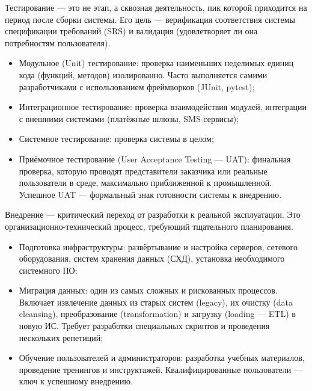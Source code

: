 \documentclass{SibFU-docs}
\begin{document}

Тестирование — это не этап, а сквозная деятельность, пик которой приходится на период после сборки системы. Его цель — верификация соответствия системы спецификации требований (SRS) и валидация (удовлетворяет ли она потребностям пользователя).


\begin{itemize}[label=-]
    \item Модульное (Unit) тестирование: проверка наименьших неделимых единиц кода (функций, методов) изолированно. Часто выполняется самими разработчиками с использованием фреймворков (JUnit, pytest);
    \item Интеграционное тестирование: проверка взаимодействия модулей, интеграции с внешними системами (платёжные шлюзы, SMS-сервисы);
    \item Системное тестирование: проверка системы в целом;
    \item Приёмочное тестирование (User Acceptance Testing — UAT): финальная проверка, которую проводят представители заказчика или реальные пользователи в среде, максимально приближенной к промышленной. Успешное UAT — формальный знак готовности системы к внедрению. \cite{Kulikov2017Testing, ISO29119-1-2022}
\end{itemize}


Внедрение — критический переход от разработки к реальной эксплуатации. Это организационно-технический процесс, требующий тщательного планирования.


\begin{itemize}[label=-]
    \item Подготовка инфраструктуры: развёртывание и настройка серверов, сетевого оборудования, систем хранения данных (СХД), установка необходимого системного ПО;
    \item Миграция данных: один из самых сложных и рискованных процессов. Включает извлечение данных из старых систем (legacy), их очистку (data cleansing), преобразование (transformation) и загрузку (loading — ETL) в новую ИС. Требует разработки специальных скриптов и проведения нескольких репетиций;
    \item Обучение пользователей и администраторов: разработка учебных материалов, проведение тренингов и инструктажей. Квалифицированные пользователи — ключ к успешному внедрению.
\end{itemize}
\end{document}
